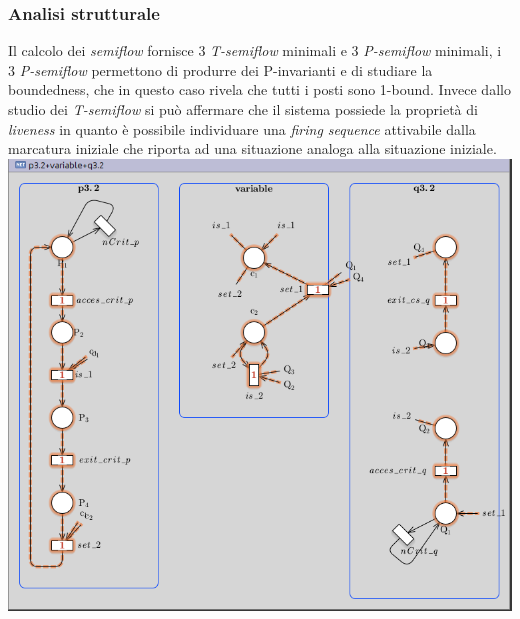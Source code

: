 \documentclass[a4paper]{article}
\begin{document}
\subsubsection{Analisi strutturale}
Il calcolo dei \textit{semiflow} fornisce 3 \textit{T-semiflow} minimali e 3 \textit{P-semiflow} minimali, i 3 \textit{P-semiflow} permettono di produrre dei P-invarianti e di studiare la boundedness, che in questo caso rivela che tutti i posti sono 1-bound.
Invece dallo studio dei \textit{T-semiflow} si può affermare che il sistema possiede la proprietà di \textit{liveness} in quanto è possibile individuare una \textit{ﬁring sequence} attivabile dalla marcatura iniziale che riporta ad una situazione analoga alla situazione iniziale.
\includegraphics[width=1\textwidth]{3.2T.png}
\end{document}
